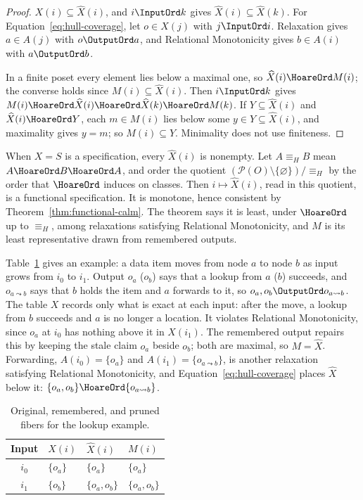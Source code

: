 \begin{proof}
$X(i)\subseteq\widehat X(i)$, and $i\InputOrd k$ gives $\widehat
X(i)\subseteq\widehat X(k)$.  For Equation~\ref{eq:hull-coverage}, let
$o\in X(j)$ with $j\InputOrd i$.  Relaxation gives $a\in A(j)$ with
$o\OutputOrd a$, and Relational Monotonicity gives $b\in A(i)$ with
$a\OutputOrd b$.

In a finite poset every element lies below a maximal one, so $\widehat
X(i)\HoareOrd M(i)$; the converse holds since $M(i)\subseteq\widehat X(i)$.
Then $i\InputOrd k$ gives $M(i)\HoareOrd\widehat X(i)\HoareOrd\widehat
X(k)\HoareOrd M(k)$.  If $Y\subseteq\widehat X(i)$ and $\widehat X(i)\HoareOrd
Y$, each $m\in M(i)$ lies below some $y\in Y\subseteq\widehat X(i)$, and
maximality gives $y=m$; so $M(i)\subseteq Y$.  Minimality does not use
finiteness.
\end{proof}

When $X=S$ is a specification, every $\widehat X(i)$ is nonempty.  Let
$A\equiv_H B$ mean $A\HoareOrd B\HoareOrd A$, and order the quotient
$(\mathcal P(O)\setminus\{\varnothing\})/{\equiv_H}$ by the order that
$\HoareOrd$ induces on classes.  Then $i\mapsto\widehat X(i)$, read in this
quotient, is a functional specification.  It is monotone, hence consistent by
Theorem~\ref{thm:functional-calm}.  The theorem says it is least, under
$\HoareOrd$ up to $\equiv_H$, among relaxations satisfying Relational
Monotonicity, and $M$ is its least representative drawn from remembered
outputs.

Table~\ref{tab:lookup-lift} gives an example: a data item moves from node $a$ to
node $b$ as input grows from $i_0$ to $i_1$.  Output $o_a$ ($o_b$) says that a
lookup from $a$ ($b$) succeeds, and $o_{a\leadsto b}$ says that $b$ holds the
item and $a$ forwards to it, so $o_a,o_b\OutputOrd o_{a\leadsto b}$.  The table
$X$ records only what is exact at each input: after the move, a lookup from $b$
succeeds and $a$ is no longer a location.  It violates Relational Monotonicity,
since $o_a$ at $i_0$ has nothing above it in $X(i_1)$.  The remembered output
repairs this by keeping the stale claim $o_a$ beside $o_b$; both are maximal,
so $M=\widehat X$.  Forwarding, $A(i_0)=\{o_a\}$ and
$A(i_1)=\{o_{a\leadsto b}\}$, is another relaxation satisfying Relational
Monotonicity, and Equation~\ref{eq:hull-coverage} places $\widehat X$ below it:
$\{o_a,o_b\}\HoareOrd\{o_{a\leadsto b}\}$.

\begin{table}[t]
  \centering
  \small
  \caption{Original, remembered, and pruned fibers for the lookup example.}
  \label{tab:lookup-lift}
  \begin{tabular}{@{}c l l l@{}}
    \toprule
    Input & $X(i)$ & $\widehat X(i)$ & $M(i)$ \\
    \midrule
    $i_0$ & $\{o_a\}$ & $\{o_a\}$ & $\{o_a\}$ \\
    $i_1$ & $\{o_b\}$ & $\{o_a,o_b\}$ & $\{o_a,o_b\}$ \\
    \bottomrule
  \end{tabular}
\end{table}

